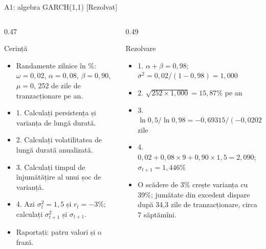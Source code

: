 \begin{frame}{A1: algebra GARCH(1,1) [Rezolvat]}
\itemsize{\scriptsize}
\begin{columns}[T]
\begin{column}{0.47\textwidth}
\begin{block}{Cerință}
\begin{itemize}
    \item Randamente zilnice în \%: $\omega = 0{,}02$, $\alpha = 0{,}08$, $\beta = 0{,}90$, $\mu = 0$, 252 de zile de tranzacționare pe an.
    \item 1. Calculați persistența și varianța de lungă durată.
    \item 2. Calculați volatilitatea de lungă durată anualizată.
    \item 3. Calculați timpul de înjumătățire al unui șoc de varianță.
    \item 4. Azi $\sigma_t^2 = 1{,}5$ și $r_t = -3\%$; calculați $\sigma_{t+1}^2$ și $\sigma_{t+1}$.
    \item Raportați: patru valori și o frază.
\end{itemize}
\end{block}
\end{column}
\begin{column}{0.49\textwidth}
\begin{exampleblock}{Rezolvare}
\begin{itemize}
    \item 1. $\alpha + \beta = 0{,}98$; $\bar\sigma^2 = 0{,}02/(1 - 0{,}98) = 1{,}000$
    \item 2. $\sqrt{252 \times 1{,}000} = 15{,}87\%$ pe an
    \item 3. $\ln 0{,}5/\ln 0{,}98 = -0{,}69315/(-0{,}02020) = 34{,}3$ zile
    \item 4. $0{,}02 + 0{,}08 \times 9 + 0{,}90 \times 1{,}5 = 2{,}090$; $\sigma_{t+1} = 1{,}446\%$
    \item O scădere de 3\% crește varianța cu 39\%; jumătate din excedent dispare după 34{,}3 zile de tranzacționare, circa 7 săptămîni.
\end{itemize}
\end{exampleblock}
\end{column}
\end{columns}
\end{frame}

